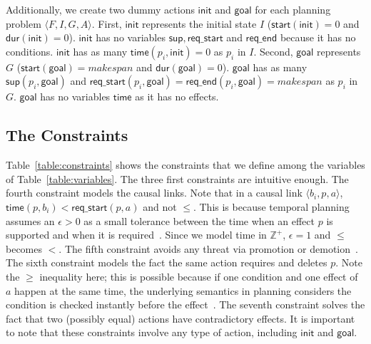 \documentclass[runningheads]{llncs}
\newcommand{\tup}[1]{{\langle #1 \rangle}}
\newcommand{\dur}{\mathsf{dur}}    %
\newcommand{\obs}{\mathsf{obs}}    %
\newcommand{\start}{\mathsf{start}}%
\newcommand{\til}{\mathsf{til}}    %
\newcommand{\supp}{\mathsf{sup}}   %
\newcommand{\tim}{\mathsf{time}}   %
\newcommand{\reqs}{\mathsf{req\_{start}}} %
\newcommand{\reqe}{\mathsf{req\_{end}}}   %
\newcommand{\ini}{\mathsf{init}}   %
\newcommand{\goal}{\mathsf{goal}}  %
\begin{document}
Additionally, we create two dummy actions $\ini$ and $\goal$ for each planning problem $\tup{F,I,G,A}$. First, $\ini$ represents the initial state $I$ ($\start(\ini)=0$ and $\dur(\ini)=0$). $\ini$ has no variables $\supp, \reqs$ and $\reqe$ because it has no conditions. $\ini$ has as many $\tim(p_i,\ini)=0$ as $p_i$ in $I$. Second, $\goal$ represents $G$ ($\start(\goal)=makespan$ and $\dur(\goal)=0$). $\goal$ has as many $\supp(p_i,\goal)$ and $\reqs(p_i,\goal)=\reqe(p_i,\goal)=makespan$ as $p_i$ in $G$. $\goal$ has no variables $\tim$ as it has no effects.





\subsection{The Constraints}

Table~\ref{table:constraints} shows the constraints that we define among the variables of Table~\ref{table:variables}. The three first constraints are intuitive enough. The fourth constraint models the causal links. Note that in a causal link $\tup{b_i,p,a}$, $\tim(p,b_i) < \reqs(p,a)$ and not $\leq$. This is because temporal planning assumes an $\epsilon > 0$ as a small tolerance between the time when an effect $p$ is supported and when it is required~\cite{fox2003pddl2}. Since we model time in $\mathbb{Z}^+$, $\epsilon=1$ and $\leq$ becomes $<$.
The fifth constraint avoids any threat via promotion or demotion~\cite{ghallab2004automated}. The sixth constraint models the fact the same action requires and deletes $p$. Note the $\geq$ inequality here; this is possible because if one condition and one effect of $a$ happen at the same time, the underlying semantics in planning considers the condition is checked instantly before the effect~\cite{fox2003pddl2}. The seventh constraint solves the fact that two (possibly equal) actions have contradictory effects. It is important to note that these constraints involve any type of action, including $\ini$ and $\goal$.
\end{document}
